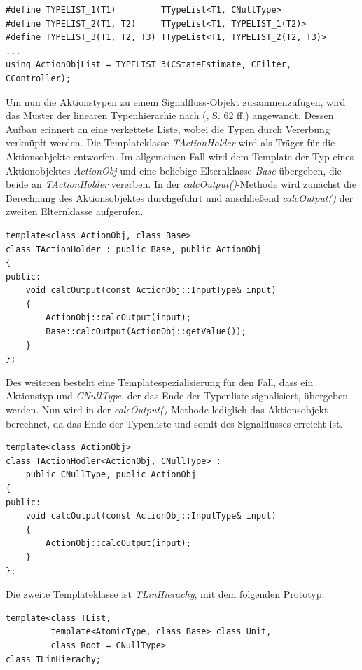 \begin{lstlisting}[caption={Definition und Aufruf der Makors für verlängerte Typenlisten},captionpos=b]
#define TYPELIST_1(T1)         TTypeList<T1, CNullType>
#define TYPELIST_2(T1, T2) 	   TTypeList<T1, TYPELIST_1(T2)>
#define TYPELIST_3(T1, T2, T3) TTypeList<T1, TYPELIST_2(T2, T3)>
...
using ActionObjList = TYPELIST_3(CStateEstimate, CFilter, CController);
\end{lstlisting}
Um nun die Aktionstypen zu einem Signalfluss-Objekt zusammenzufügen, wird das Muster der linearen Typenhierachie nach (\cite{ModernCpp}, S. 62 ff.) angewandt. Dessen Aufbau erinnert an eine verkettete Liste, wobei die Typen durch Vererbung verknüpft werden. Die Templateklasse \textit{TActionHolder} wird als Träger für die Aktionsobjekte entworfen.
Im allgemeinen Fall wird dem Template der Typ eines Aktionobjektes \textit{ActionObj} und eine beliebige Elternklasse \textit{Base} übergeben, die beide an \textit{TActionHolder} vererben. In der \textit{calcOutput()}-Methode wird zunächst die Berechnung des Aktionsobjektes durchgeführt und anschließend \textit{calcOutput()} der zweiten Elternklasse aufgerufen.
\begin{lstlisting}[caption={Templateklasse des Trägerobjektes},captionpos=b]
template<class ActionObj, class Base>
class TActionHolder : public Base, public ActionObj
{
public:
	void calcOutput(const ActionObj::InputType& input)
	{
		ActionObj::calcOutput(input);
		Base::calcOutput(ActionObj::getValue());
	}
};
\end{lstlisting}
Des weiteren besteht eine Templatespezialisierung für den Fall, dass ein Aktionstyp und \textit{CNullType}, der das Ende der Typenliste signalisiert, übergeben werden. Nun wird in der \textit{calcOutput()}-Methode lediglich das Aktionsobjekt berechnet, da das Ende der Typenliste und somit des Signalflusses erreicht ist.
\begin{lstlisting}[caption={Templatespezialisierung des Trägerobjektes für das Ende der Typenliste},captionpos=b]
template<class ActionObj>
class TActionHodler<ActionObj, CNullType> : 
	public CNullType, public ActionObj
{
public:
	void calcOutput(const ActionObj::InputType& input)
	{
		ActionObj::calcOutput(input);
	}
};
\end{lstlisting}
Die zweite Templateklasse ist \textit{TLinHierachy}, mit dem folgenden Prototyp.
\begin{lstlisting}[caption={Deklaration der Templateklasse für lineare Hierarchien (\cite{ModernCpp}, S. 63)},captionpos=b]
template<class TList,
         template<AtomicType, class Base> class Unit,
         class Root = CNullType>
class TLinHierachy;
\end{lstlisting}
